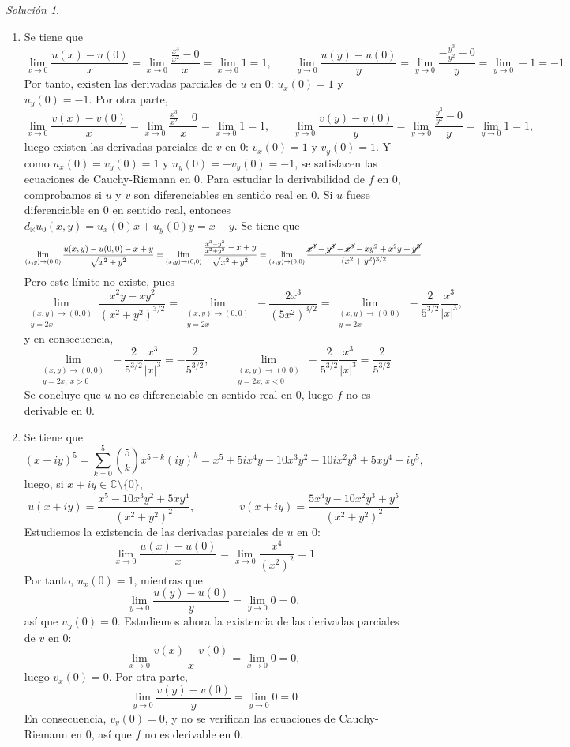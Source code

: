 \documentclass[11pt]{report}
\newcommand{\R}{\mathbb R}
\newcommand{\C}{\mathbb C}
\theoremstyle{remark}
\newtheorem*{resolution}{Solución}
\begin{document}
\begin{resolution}
\hfill
\begin{enumerate}
    \item Se tiene que
    \[\lim_{x \to 0}\frac{u(x) - u(0)}{x} =  \lim_{x \to 0} \frac{\frac{x^3}{x^2}-0}{x} = \lim_{x \to 0} 1 = 1, \qquad \lim_{y \to 0}\frac{u(y)-u(0)}{y} = \lim_{y \to 0} \frac{-\frac{y^3}{y^2}-0}{y} = \lim_{y \to 0} -1 = -1\]
    Por tanto, existen las derivadas parciales de $u$ en 0: $u_x(0) = 1$ y $u_y(0) = -1$. Por otra parte,
    \[\lim_{x \to 0}\frac{v(x) - v(0)}{x} =  \lim_{x \to 0} \frac{\frac{x^3}{x^2}-0}{x} = \lim_{x \to 0} 1 = 1, \qquad \lim_{y \to 0}\frac{v(y)-v(0)}{y} = \lim_{y \to 0} \frac{\frac{y^3}{y^2}-0}{y} = \lim_{y \to 0} 1 = 1,\]
    luego existen las derivadas parciales de $v$ en 0: $v_x(0) = 1$ y $v_y(0) = 1$. Y como $u_x(0) = v_y(0) = 1$ y $u_y(0)=-v_y(0)=-1$, se satisfacen las ecuaciones de Cauchy-Riemann en 0. Para estudiar la derivabilidad de $f$ en 0, comprobamos si $u$ y $v$ son diferenciables en sentido real en $0$. Si $u$ fuese diferenciable en 0 en sentido real, entonces $d_\R u_0(x,y) = u_x(0)x+u_y(0)y = x-y$. Se tiene que
    \[
    \lim_{(x,y) \to (0,0)} \frac{u(x,y)-u(0,0)-x+y}{\sqrt{x^2+y^2}} = \lim_{(x,y) \to (0,0)} \frac{\frac{x^3-y^3}{x^2+y^2}-x+y}{\sqrt{x^2+y^2}} = \lim_{(x,y) \to (0,0)} \frac{\cancel{x^3}-\cancel{y^3}-\cancel{x^3}-xy^2+x^2y+\cancel{y^3}}{(x^2+y^2)^{3/2}}
    \]
    Pero este límite no existe, pues
    \[\lim_{\substack{(x,y) \to (0,0) \\ y=2x}} \frac{x^2y-xy^2}{(x^2+y^2)^{3/2}} = \lim_{\substack{(x,y) \to (0,0) \\ y=2x}} -\frac{2x^3}{(5x^2)^{3/2}} = \lim_{\substack{(x,y) \to (0,0) \\ y=2x}} -\frac{2}{5^{3/2}}\frac{x^3}{|x|^3},\]
    y en consecuencia,
    \[\lim_{\substack{(x,y) \to (0,0) \\ y=2x, \ x>0}} -\frac{2}{5^{3/2}}\frac{x^3}{|x|^3} = -\frac{2}{5^{3/2}}, \qquad \lim_{\substack{(x,y) \to (0,0) \\ y=2x, \ x<0}} -\frac{2}{5^{3/2}}\frac{x^3}{|x|^3} =\frac{2}{5^{3/2}}\]
    Se concluye que $u$ no es diferenciable en sentido real en $0$, luego $f$ no es derivable en $0$.
    \item Se tiene que
    \[(x+iy) ^5 = \sum_{k=0}^5\binom{5}{k}x^{5-k}(iy)^k = x^5+5ix^4y-10x^3y^2-10ix^2y^3+5xy^4+iy^5,\]
    luego, si $x+iy \in \C \setminus \{0\}$,
    \[u(x+iy) = \frac{x^5-10x^3y^2+5xy^4}{(x^2+y^2)^2}, \qquad \qquad v(x+iy) = \frac{5x^4y-10x^2y^3+y^5}{(x^2+y^2)^2}\]
    Estudiemos la existencia de las derivadas parciales de $u$ en 0:
    \[\lim_{x \to 0} \frac{u(x)-u(0)}{x} = \lim_{x \to 0} \frac{x^4}{(x^2)^2} = 1\]
    Por tanto, $u_x(0) = 1$, mientras que
    \[\lim_{y \to 0} \frac{u(y)-u(0)}{y} = \lim_{y \to 0} 0 = 0,\]
    así que $u_y(0)=0$. Estudiemos ahora la existencia de las derivadas parciales de $v$ en 0:
    \[\lim_{x \to 0} \frac{v(x)-v(0)}{x} = \lim_{x \to 0} 0 = 0,\]
    luego $v_x(0)=0$. Por otra parte,
    \[\lim_{y \to 0} \frac{v(y)-v(0)}{y} = \lim_{y \to 0} 0 = 0\]
    En consecuencia, $v_y(0) =0$, y no se verifican las ecuaciones de Cauchy-Riemann en $0$, así que $f$ no es derivable en $0$.


\end{enumerate}
\end{resolution}
\end{document}
